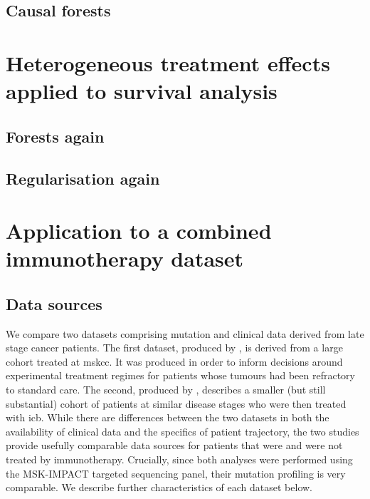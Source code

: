 \documentclass[../thesis.tex]{subfiles}
\begin{document}
\subsection{Causal forests}
\citep{athey_generalized_2019}

\section{Heterogeneous treatment effects applied to survival analysis \label{sec:hte_survival}}

\subsection{Forests again \label{sec:surv_hte_forests}}
\citep{cui_estimating_2022}

\subsection{Regularisation again}
\citep{chapfuwa_enabling_2021}

\section{Application to a combined immunotherapy dataset \label{sec:immuno_hte}}

\subsection{Data sources}

We compare two datasets comprising mutation and clinical data derived from late stage cancer patients. The first dataset, produced by \citet{zehir_mutational_2017}, is derived from a large cohort treated at \gls{mskcc}. It was produced in order to inform decisions around experimental treatment regimes for patients whose tumours had been refractory to standard care. The second, produced by \citet{hellmann_genomic_2018}, describes a smaller (but still substantial) cohort of patients at similar disease stages who were then treated with \gls{icb}. While there are differences between the two datasets in both the availability of clinical data and the specifics of patient trajectory, the two studies provide usefully comparable data sources for patients that were and were not treated by immunotherapy. Crucially, since both analyses were performed using the MSK-IMPACT targeted sequencing panel, their mutation profiling is very comparable. We describe further characteristics of each dataset below. 
\end{document}

